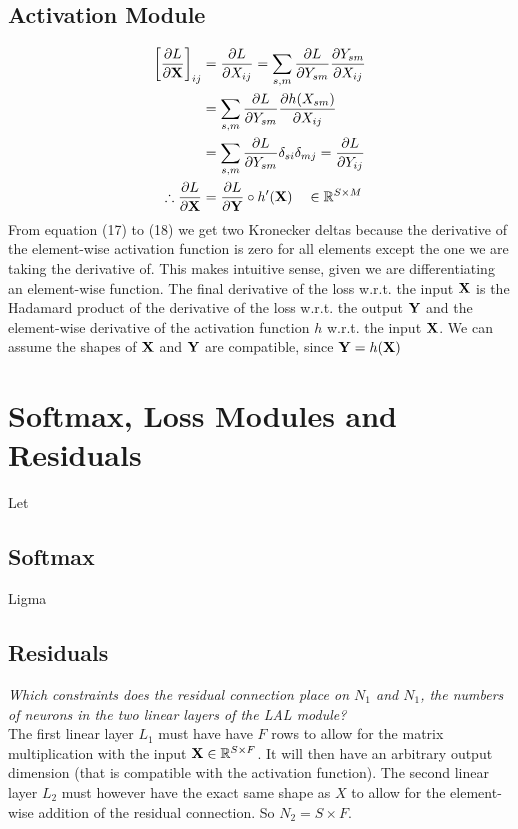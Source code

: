 \documentclass[a4paper]{article}
\begin{document}
\subsection{Activation Module} %
\begin{align}
   \left[ \frac{\partial L}{\partial \mathbf{X}} \right]_{ij} &= \frac{\partial L}{\partial X_{ij}} = \sum_{s,m} \frac{\partial L}{\partial Y_{sm}} \frac{\partial Y_{sm}}{\partial X_{ij}} \\
   &= \sum_{s,m} \frac{\partial L}{\partial Y_{sm}} \frac{\partial h(X_{sm})}{\partial X_{ij}} \\
   &= \sum_{s,m} \frac{\partial L}{\partial Y_{sm}} \delta_{si} \delta_{mj} = \frac{\partial L}{\partial Y_{ij}} \\
   \therefore \frac{\partial L}{\partial \mathbf{X}} &= \frac{\partial L}{\partial \mathbf{Y}} \circ h'(\mathbf{X}) \quad \in \mathbb{R}^{S \times M}
\end{align}
From equation (17) to (18) we get two Kronecker deltas because the derivative of the element-wise activation function
is zero for all elements except the one we are taking the derivative of. This makes intuitive sense, given we are
differentiating an element-wise function. The final derivative of the loss w.r.t. the input $\mathbf{X}$ is the Hadamard
product of the derivative of the loss w.r.t. the output $\mathbf{Y}$ and the element-wise derivative of the activation
function $h$ w.r.t. the input $\mathbf{X}$. We can assume the shapes of $\mathbf{X}$ and $\mathbf{Y}$ are compatible, since $\mathbf{Y}=h(\mathbf{X})$
\bigskip

\section{Softmax, Loss Modules and Residuals}
Let 
\subsection{Softmax} %
Ligma
\bigskip

\subsection{Residuals} %
\textit{Which constraints does the residual connection place on $N_1$ and $N_1$, the numbers of neurons in the two linear layers of the LAL module?}\\
The first linear layer $L_1$ must have have $F$ rows to allow for the matrix multiplication with the input $\mathbf{X} \in \mathbb{R}^{S \times F}$.
It will then have an arbitrary output dimension (that is compatible with the activation function). The second linear layer $L_2$ must however have
the exact same shape as $X$ to allow for the element-wise addition of the residual connection. So $N_2 = S \times F$.
\bigskip
\end{document}
